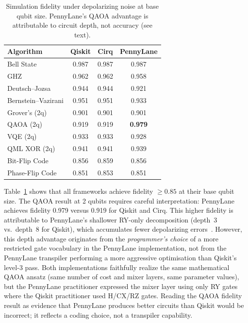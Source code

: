 \begin{table}[t]
\caption{Simulation fidelity under depolarizing noise at base qubit size.
  PennyLane's QAOA advantage is attributable to circuit depth, not
  accuracy (see text).}
\label{tab:fidelity}
\centering
\begin{tabular}{lccc}
\toprule
\textbf{Algorithm}      & \textbf{Qiskit} & \textbf{Cirq} & \textbf{PennyLane} \\
\midrule
Bell State              & 0.987 & 0.987 & 0.987 \\
GHZ                     & 0.962 & 0.962 & 0.958 \\
Deutsch--Jozsa          & 0.944 & 0.944 & 0.921 \\
Bernstein--Vazirani     & 0.951 & 0.951 & 0.933 \\
Grover's (2q)           & 0.901 & 0.901 & 0.901 \\
QAOA (2q)               & 0.919 & 0.919 & \textbf{0.979} \\
VQE (2q)                & 0.933 & 0.933 & 0.928 \\
QML XOR (2q)            & 0.941 & 0.941 & 0.939 \\
Bit-Flip Code           & 0.856 & 0.859 & 0.856 \\
Phase-Flip Code         & 0.851 & 0.853 & 0.851 \\
\bottomrule
\end{tabular}
\end{table}

Table~\ref{tab:fidelity} shows that all frameworks achieve fidelity
$\geq 0.85$ at their base qubit size.
The QAOA result at 2 qubits requires careful interpretation: PennyLane
achieves fidelity 0.979 versus 0.919 for Qiskit and Cirq.
This higher fidelity is attributable to PennyLane's shallower
RY-only decomposition (depth~3 vs.\ depth~8 for Qiskit), which
accumulates fewer depolarizing errors~\cite{nielsen2010quantum}.
However, this depth advantage originates from the \emph{programmer's
choice} of a more restricted gate vocabulary in the PennyLane
implementation, not from the PennyLane transpiler performing a more
aggressive optimisation than Qiskit's level-3 pass.
Both implementations faithfully realize the same mathematical QAOA ansatz
(same number of cost and mixer layers, same parameter values), but the
PennyLane practitioner expressed the mixer layer using only RY gates
where the Qiskit practitioner used H/CX/RZ gates.
Reading the QAOA fidelity result as evidence that PennyLane produces
better circuits than Qiskit would be incorrect; it reflects a coding
choice, not a transpiler capability.

